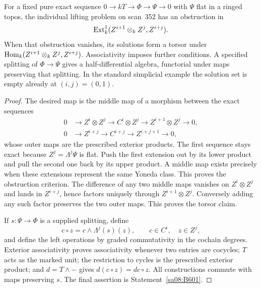 \begin{proposition}\label{sa08:B602}
For a fixed pure exact sequence $0\to kT\to\Phi\to\Psi\to0$ with
$\Psi$ flat in a ringed topos, the individual lifting problem on
scan~352 has an obstruction in
\[
 \operatorname{Ext}^1_k(Z^{i+1}\otimes_k Z^j,Z^{i+j}).
\]
When that obstruction vanishes, its solutions form a torsor under
$\operatorname{Hom}_k(Z^{i+1}\otimes_k Z^j,Z^{i+j})$. Associativity imposes further
conditions. A specified splitting of $\Phi\to\Psi$ gives a
half-differential algebra, functorial under maps preserving that
splitting. In the standard simplicial example the solution set is
empty already at $(i,j)=(0,1)$.
\end{proposition}
\begin{proof}
The desired map is the middle map of a morphism between the exact
sequences
\[
\begin{aligned}
 0&\longrightarrow Z^i\otimes Z^j
 \longrightarrow C^i\otimes Z^j
 \longrightarrow Z^{i+1}\otimes Z^j\longrightarrow0,\\
 0&\longrightarrow Z^{i+j}\longrightarrow C^{i+j}
 \longrightarrow Z^{i+j+1}\longrightarrow0,
\end{aligned}
\]
whose outer maps are the prescribed exterior products. The first
sequence stays exact because $Z^j=\Lambda^j\Psi$ is flat. Push the
first extension out by its lower product and pull the second one
back by its upper product. A middle map exists precisely when these
extensions represent the same Yoneda class. This proves the
obstruction criterion. The difference of any two middle maps
vanishes on $Z^i\otimes Z^j$ and lands in $Z^{i+j}$, hence factors
uniquely through $Z^{i+1}\otimes Z^j$. Conversely adding any such
factor preserves the two outer maps. This proves the torsor claim.

If $s:\Psi\to\Phi$ is a supplied splitting, define
\[
 c\circ z=c\wedge\Lambda^j(s)(z),\qquad c\in C^i,\quad z\in Z^j,
\]
and define the left operations by graded commutativity in the
cochain degrees. Exterior associativity proves associativity
whenever two entries are cocycles; $T$ acts as the marked unit;
the restriction to cycles is the prescribed exterior product; and
$d=T\wedge-$ gives $d(c\circ z)=dc\circ z$. All constructions
commute with maps preserving $s$. The final assertion is
Statement~\ref{sa08:B601}.
\end{proof}

